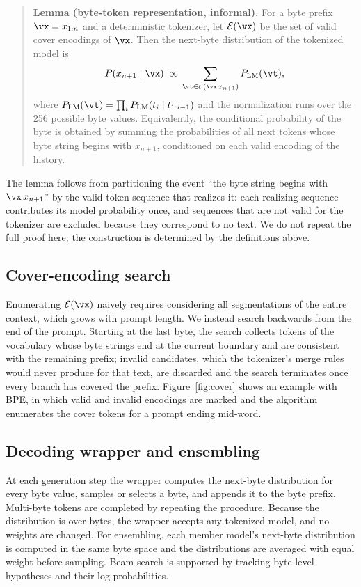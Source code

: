 \documentclass{article} %
\begin{document}
\begin{quote}
\textbf{Lemma (byte-token representation, informal).} For a byte prefix $\vx = x_{1:n}$ and a deterministic tokenizer, let $\mathcal{E}(\vx)$ be the set of valid cover encodings of $\vx$. Then the next-byte distribution of the tokenized model is
\begin{equation}
P(x_{n+1} \mid \vx) \;\propto\; \sum_{\vt \in \mathcal{E}(\vx \, x_{n+1})} P_{\mathrm{LM}}(\vt),
\end{equation}
where $P_{\mathrm{LM}}(\vt) = \prod_{i} P_{\mathrm{LM}}(t_i \mid t_{1:i-1})$ and the normalization runs over the 256 possible byte values. Equivalently, the conditional probability of the byte is obtained by summing the probabilities of all next tokens whose byte string begins with $x_{n+1}$, conditioned on each valid encoding of the history.
\end{quote}

The lemma follows from partitioning the event ``the byte string begins with $\vx\,x_{n+1}$'' by the valid token sequence that realizes it: each realizing sequence contributes its model probability once, and sequences that are not valid for the tokenizer are excluded because they correspond to no text. We do not repeat the full proof here; the construction is determined by the definitions above.

\subsection{Cover-encoding search}
Enumerating $\mathcal{E}(\vx)$ naively requires considering all segmentations of the entire context, which grows with prompt length. We instead search backwards from the end of the prompt. Starting at the last byte, the search collects tokens of the vocabulary whose byte strings end at the current boundary and are consistent with the remaining prefix; invalid candidates, which the tokenizer's merge rules would never produce for that text, are discarded and the search terminates once every branch has covered the prefix. Figure~\ref{fig:cover} shows an example with BPE, in which valid and invalid encodings are marked and the algorithm enumerates the cover tokens for a prompt ending mid-word.

\subsection{Decoding wrapper and ensembling}
At each generation step the wrapper computes the next-byte distribution for every byte value, samples or selects a byte, and appends it to the byte prefix. Multi-byte tokens are completed by repeating the procedure. Because the distribution is over bytes, the wrapper accepts any tokenized model, and no weights are changed. For ensembling, each member model's next-byte distribution is computed in the same byte space and the distributions are averaged with equal weight before sampling. Beam search is supported by tracking byte-level hypotheses and their log-probabilities.
\end{document}
